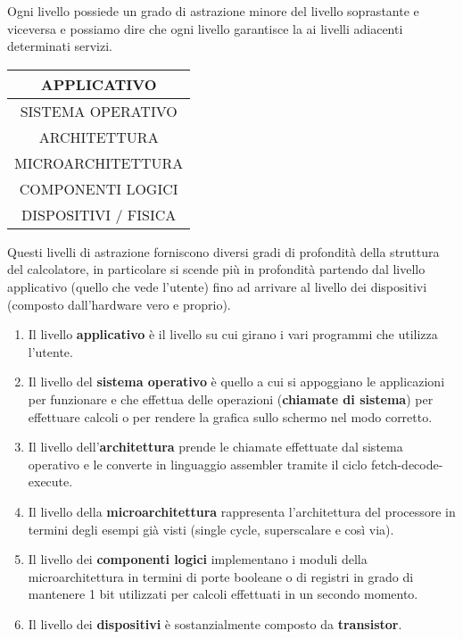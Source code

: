 Ogni livello possiede un grado di astrazione minore del livello soprastante e viceversa e possiamo
dire che ogni livello garantisce la ai livelli adiacenti determinati servizi.

\begin{center}
	\begin{tabular}{|c|}
		\hline
		APPLICATIVO          \\ \hline
		SISTEMA OPERATIVO    \\ \hline
		ARCHITETTURA         \\ \hline
		MICROARCHITETTURA    \\ \hline
		COMPONENTI LOGICI    \\ \hline
		DISPOSITIVI / FISICA \\ \hline
	\end{tabular}
\end{center}

Questi livelli di astrazione forniscono diversi gradi di profondità della struttura del calcolatore,
in particolare si scende più in profondità partendo dal livello applicativo (quello che vede
l'utente) fino ad arrivare al livello dei dispositivi (composto dall'hardware vero e proprio).
\begin{enumerate}
	\item Il livello \textbf{applicativo} è il livello su cui girano i vari programmi che utilizza
	      l'utente.
	\item Il livello del \textbf{sistema operativo} è quello a cui si appoggiano le applicazioni
	      per funzionare e che effettua delle operazioni (\textbf{chiamate di sistema}) per
	      effettuare calcoli o per rendere la grafica sullo schermo nel modo corretto.
	\item Il livello dell'\textbf{architettura} prende le chiamate effettuate dal sistema operativo
	      e le converte in linguaggio assembler tramite il ciclo fetch-decode-execute.
	\item Il livello della \textbf{microarchitettura} rappresenta l'architettura del processore
	      in termini degli esempi già visti (single cycle, superscalare e così via).
	\item Il livello dei \textbf{componenti logici} implementano i moduli della microarchitettura
	      in termini di porte booleane o di registri in grado di mantenere 1 bit utilizzati per
	      calcoli effettuati in un secondo momento.
	\item Il livello dei \textbf{dispositivi} è sostanzialmente composto da \textbf{transistor}.
\end{enumerate}

